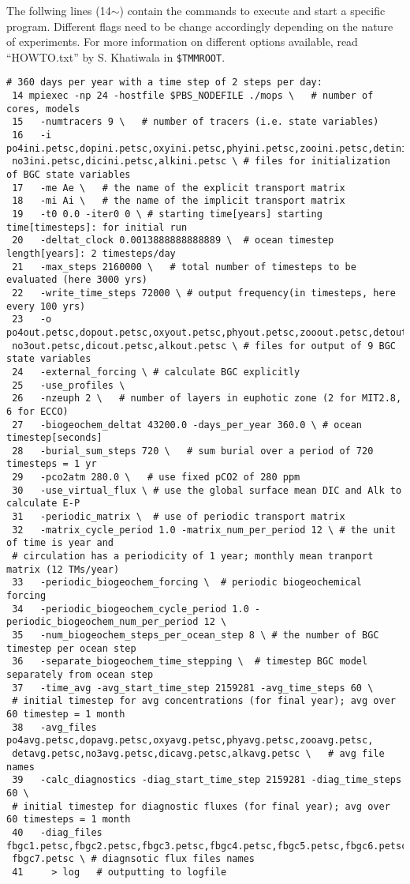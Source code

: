 \documentclass[a4paper]{article}
\begin{document}
The follwing lines (14$\sim$) contain the commands to execute and start a specific program. Different flags need to be change accordingly depending on the nature of experiments. For more information on different options available, read ``HOWTO.txt'' by S. Khatiwala in \verb|$TMMROOT|. 
\begin{lstlisting}[frame=single,basicstyle=\scriptsize,commentstyle=\color{blue}]
 # 360 days per year with a time step of 2 steps per day:
 14 mpiexec -np 24 -hostfile $PBS_NODEFILE ./mops \   # number of cores, models
 15   -numtracers 9 \   # number of tracers (i.e. state variables)
 16   -i po4ini.petsc,dopini.petsc,oxyini.petsc,phyini.petsc,zooini.petsc,detini.petsc,
 no3ini.petsc,dicini.petsc,alkini.petsc \ # files for initialization of BGC state variables
 17   -me Ae \   # the name of the explicit transport matrix
 18   -mi Ai \   # the name of the implicit transport matrix
 19   -t0 0.0 -iter0 0 \ # starting time[years] starting time[timesteps]: for initial run
 20   -deltat_clock 0.0013888888888889 \  # ocean timestep length[years]: 2 timesteps/day
 21   -max_steps 2160000 \   # total number of timesteps to be evaluated (here 3000 yrs)
 22   -write_time_steps 72000 \ # output frequency(in timesteps, here every 100 yrs)
 23   -o po4out.petsc,dopout.petsc,oxyout.petsc,phyout.petsc,zooout.petsc,detout.petsc,
 no3out.petsc,dicout.petsc,alkout.petsc \ # files for output of 9 BGC state variables
 24   -external_forcing \ # calculate BGC explicitly
 25   -use_profiles \
 26   -nzeuph 2 \   # number of layers in euphotic zone (2 for MIT2.8, 6 for ECCO)
 27   -biogeochem_deltat 43200.0 -days_per_year 360.0 \ # ocean timestep[seconds]
 28   -burial_sum_steps 720 \   # sum burial over a period of 720 timesteps = 1 yr
 29   -pco2atm 280.0 \   # use fixed pCO2 of 280 ppm
 30   -use_virtual_flux \ # use the global surface mean DIC and Alk to calculate E-P
 31   -periodic_matrix \  # use of periodic transport matrix
 32   -matrix_cycle_period 1.0 -matrix_num_per_period 12 \ # the unit of time is year and 
 # circulation has a periodicity of 1 year; monthly mean tranport matrix (12 TMs/year)
 33   -periodic_biogeochem_forcing \  # periodic biogeochemical forcing
 34   -periodic_biogeochem_cycle_period 1.0 -periodic_biogeochem_num_per_period 12 \
 35   -num_biogeochem_steps_per_ocean_step 8 \ # the number of BGC timestep per ocean step
 36   -separate_biogeochem_time_stepping \  # timestep BGC model separately from ocean step
 37   -time_avg -avg_start_time_step 2159281 -avg_time_steps 60 \ 
 # initial timestep for avg concentrations (for final year); avg over 60 timestep = 1 month
 38   -avg_files po4avg.petsc,dopavg.petsc,oxyavg.petsc,phyavg.petsc,zooavg.petsc,
 detavg.petsc,no3avg.petsc,dicavg.petsc,alkavg.petsc \   # avg file names
 39   -calc_diagnostics -diag_start_time_step 2159281 -diag_time_steps 60 \
 # initial timestep for diagnostic fluxes (for final year); avg over 60 timesteps = 1 month
 40   -diag_files fbgc1.petsc,fbgc2.petsc,fbgc3.petsc,fbgc4.petsc,fbgc5.petsc,fbgc6.petsc,
 fbgc7.petsc \ # diagnsotic flux files names
 41     > log   # outputting to logfile
\end{lstlisting}
\end{document}
